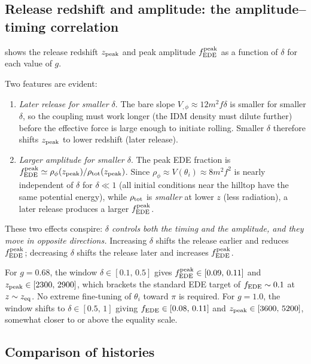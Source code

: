 \documentclass[aps,onecolumn,prd,nofootinbib,superscriptaddress,10pt,longbibliography,floatfix]{revtex4-2}
\newcommand{\fe}{f_{\rm EDE}}
\begin{document}
\subsection{Release redshift and amplitude: the amplitude--timing correlation}

 shows the release redshift $z_{\rm peak}$ and peak amplitude $\fe^{\rm peak}$ as a function of $\delta$ for each value of $g$.

Two features are evident:
\begin{enumerate}
\item \emph{Later release for smaller $\delta$}. The bare slope $V_{,\phi}\approx 12m^2f\delta$ is smaller for smaller $\delta$, so the coupling must work longer (the IDM density must dilute further) before the effective force is large enough to initiate rolling. Smaller $\delta$ therefore shifts $z_{\rm peak}$ to lower redshift (later release).

\item \emph{Larger amplitude for smaller $\delta$}. The peak EDE fraction is $\fe^{\rm peak}\simeq \rho_\phi(z_{\rm peak})/\rho_{\rm tot}(z_{\rm peak})$. Since $\rho_\phi\approx V(\theta_i)\approx 8m^2f^2$ is nearly independent of $\delta$ for $\delta\ll 1$ (all initial conditions near the hilltop have the same potential energy), while $\rho_{\rm tot}$ is \emph{smaller} at lower $z$ (less radiation), a later release produces a larger $\fe^{\rm peak}$.
\end{enumerate}

These two effects conspire: \emph{$\delta$ controls both the timing and the amplitude, and they move in opposite directions.} Increasing $\delta$ shifts the release earlier and reduces $\fe^{\rm peak}$; decreasing $\delta$ shifts the release later and increases $\fe^{\rm peak}$.

For $g=0.68$, the window $\delta\in[0.1,\,0.5]$ gives $\fe^{\rm peak}\in[0.09,\,0.11]$ and $z_{\rm peak}\in[2300,\,2900]$, which brackets the standard EDE target of $\fe\sim 0.1$ at $z\sim z_{\rm eq}$. No extreme fine-tuning of $\theta_i$ toward $\pi$ is required. For $g=1.0$, the window shifts to $\delta\in[0.5,\,1]$ giving $\fe\in[0.08,\,0.11]$ and $z_{\rm peak}\in[3600,\,5200]$, somewhat closer to or above the equality scale.

\subsection{Comparison of histories}
\end{document}
